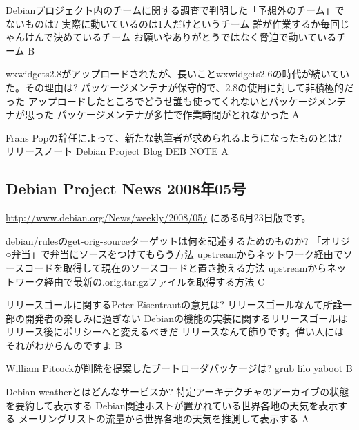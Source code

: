 \documentclass[cjk,dvipdfmx,12pt]{beamer}
\begin{document}
 \santaku
 {Debianプロジェクト内のチームに関する調査で判明した「予想外のチーム」でないものは?}%
 {実際に動いているのは1人だけというチーム}
 {誰が作業するか毎回じゃんけんで決めているチーム}
 {お願いやありがとうではなく脅迫で動いているチーム}
 {B}
 
 \santaku
 {wxwidgets2.8がアップロードされたが、長いことwxwidgets2.6の時代が続いていた。その理由は?}
 {パッケージメンテナが保守的で、2.8の使用に対して非積極的だった}
 {アップロードしたところでどうせ誰も使ってくれないとパッケージメンテナが思った}
 {パッケージメンテナが多忙で作業時間がとれなかった}
 {A}%
 
 \santaku
 {Frans Popの辞任によって、新たな執筆者が求められるようになったものとは?}
 {リリースノート}
 {Debian Project Blog}%
 {DEB NOTE}%
 {A}
 
 \subsection{Debian Project News 2008年05号}
 \url{http://www.debian.org/News/weekly/2008/05/}
 にある6月23日版です。
 
 \santaku
 {debian/rulesのget-orig-sourceターゲットは何を記述するためのものか?}
 {「オリジ○弁当」で弁当にソースをつけてもらう方法}
 {upstreamからネットワーク経由でソースコードを取得して現在のソースコードと置き換える方法}
 {upstreamからネットワーク経由で最新の.orig.tar.gzファイルを取得する方法}
 {C}%
 
 \santaku
 {リリースゴールに関するPeter Eisentrautの意見は?}
 {リリースゴールなんて所詮一部の開発者の楽しみに過ぎない}
 {Debianの機能の実装に関するリリースゴールはリリース後にポリシーへと変えるべきだ}
 {リリースなんて飾りです。偉い人にはそれがわからんのですよ}
 {B}
 
 \santaku
 {William Pitcockが削除を提案したブートローダパッケージは?}
 {grub}
 {lilo}
 {yaboot}
 {B}%
 
 \santaku
 {Debian weatherとはどんなサービスか?}
 {特定アーキテクチャのアーカイブの状態を要約して表示する}%
 {Debian関連ホストが置かれている世界各地の天気を表示する}%
 {メーリングリストの流量から世界各地の天気を推測して表示する}%
 {A}
 
\end{document}
